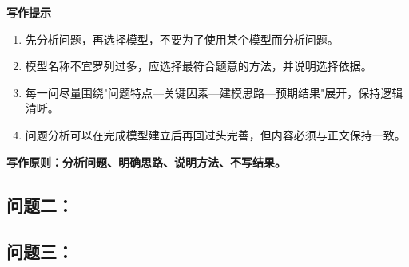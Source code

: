 \textbf{写作提示}

\begin{enumerate}[label=(\arabic*), leftmargin=2.5em, itemsep=0.3em]
\item 先分析问题，再选择模型，不要为了使用某个模型而分析问题。

\item 模型名称不宜罗列过多，应选择最符合题意的方法，并说明选择依据。

\item 每一问尽量围绕"问题特点—关键因素—建模思路—预期结果"展开，保持逻辑清晰。

\item 问题分析可以在完成模型建立后再回过头完善，但内容必须与正文保持一致。
\end{enumerate}

\textbf{写作原则：分析问题、明确思路、说明方法、不写结果。}

\subsection*{问题二：}

\subsection*{问题三：}
